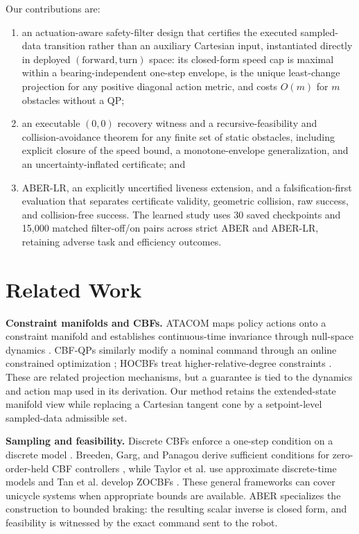 \documentclass[letterpaper]{article}
\begin{document}
Our contributions are:
\begin{enumerate}
\item an actuation-aware safety-filter design that certifies the executed
sampled-data transition rather than an auxiliary Cartesian input, instantiated
directly in deployed $(\text{forward},\text{turn})$ space: its closed-form
speed cap is maximal within a bearing-independent one-step envelope, is the
unique least-change projection for any positive diagonal action metric, and
costs $O(m)$ for $m$ obstacles without a QP;
\item an executable $(0,0)$ recovery witness and a recursive-feasibility and
collision-avoidance theorem for any finite set of static obstacles, including
explicit closure of the speed bound, a monotone-envelope generalization, and
an uncertainty-inflated certificate; and
\item ABER-LR, an explicitly uncertified liveness extension, and a
falsification-first evaluation that separates certificate validity,
geometric collision, raw success, and collision-free success.  The learned
study uses 30 saved checkpoints and 15,000 matched filter-off/on pairs across
strict ABER and ABER-LR, retaining adverse task and efficiency outcomes.
\end{enumerate}

\section{Related Work}

\textbf{Constraint manifolds and CBFs.}
ATACOM maps policy actions onto a constraint manifold and establishes
continuous-time invariance through null-space dynamics
\cite{liu2022,liu2024,liu2025}.  CBF-QPs similarly modify a nominal command
through an online constrained optimization \cite{ames2017}; HOCBFs treat
higher-relative-degree constraints \cite{xiao2021}.  These are related
projection mechanisms, but a guarantee is tied to the dynamics and action map
used in its derivation.  Our method retains the extended-state manifold view
while replacing a Cartesian tangent cone by a setpoint-level sampled-data
admissible set.

\textbf{Sampling and feasibility.}
Discrete CBFs enforce a one-step condition on a discrete model
\cite{agrawal2017,zeng2021}.  Breeden, Garg, and Panagou derive sufficient
conditions for zero-order-held CBF controllers \cite{breeden2022}, while
Taylor et al. use approximate discrete-time models \cite{taylor2022} and Tan
et al. develop ZOCBFs \cite{tan2025}.  These general frameworks can cover
unicycle systems when appropriate bounds are available.  ABER specializes
the construction to bounded braking: the resulting scalar inverse is closed
form, and feasibility is witnessed by the exact command sent to the robot.
\end{document}
